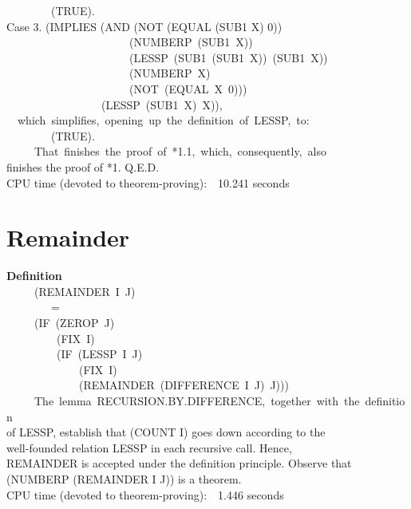\documentclass[10pt]{book}
\newenvironment{pubasis}{\begin{flushleft}}{\end{flushleft}}
\newcommand{\axiomordefinition}[1]{\vspace{6pt}\Large\textsf{\textbf{#1}}\normalsize}
\begin{document}
\begin{pubasis}
~~~~~~~~(TRUE).\\

Case 3.	(IMPLIES (AND (NOT (EQUAL (SUB1 X) 0))\\
~~~~~~~~~~~~~~~~~~~~~~(NUMBERP~(SUB1~X))\\
~~~~~~~~~~~~~~~~~~~~~~(LESSP~(SUB1~(SUB1~X))~(SUB1~X))\\
~~~~~~~~~~~~~~~~~~~~~~(NUMBERP~X)\\
~~~~~~~~~~~~~~~~~~~~~~(NOT~(EQUAL~X~0)))\\
~~~~~~~~~~~~~~~~~(LESSP~(SUB1~X)~X)),\\

~~which~simplifies,~opening~up~the~definition~of~LESSP,~to:\\

~~~~~~~~(TRUE).\\

~~~~~That~finishes~the~proof~of~*1.1,~which,~consequently,~also\\
finishes the proof of *1.  Q.E.D.\\

CPU time (devoted to theorem-proving):~~10.241 seconds\\
\end{pubasis}
\section{Remainder}
\begin{pubasis}
\axiomordefinition{Definition}\\
~~~~~(REMAINDER~I~J)\\
~~~~~~~~=\\
~~~~~(IF~(ZEROP~J)\\
~~~~~~~~~(FIX~I)\\
~~~~~~~~~(IF~(LESSP~I~J)\\
~~~~~~~~~~~~~(FIX~I)\\
~~~~~~~~~~~~~(REMAINDER~(DIFFERENCE~I~J)~J)))\\

~~~~~The~lemma~RECURSION.BY.DIFFERENCE,~together~with~the~definition\\
of LESSP, establish that (COUNT I) goes down according to the\\
well-founded relation LESSP in each recursive call.  Hence,\\
REMAINDER is accepted under the definition principle.  Observe that\\
(NUMBERP (REMAINDER I J)) is a theorem.\\

CPU time (devoted to theorem-proving):~~1.446 seconds\\
\end{pubasis}
\end{document}
